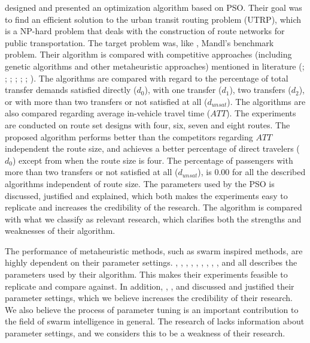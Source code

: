 \citet{kechagiopoulos14} designed and presented an optimization algorithm based on PSO. Their goal was to find an efficient solution to the urban transit routing problem (UTRP), which is a NP-hard problem that deals with the construction of route networks for public transportation. The target problem was, like \citet{nikolic14}, Mandl's benchmark problem. Their algorithm is compared with competitive approaches (including genetic algorithms and other metaheuristic approaches) mentioned in literature (\citet{baaj91}; \citet{chakroborty02}; \citet{kidwai98}; \citet{fan10}; \citet{fan09-2}; \citet{zhang10}; \citet{chew12}). The algorithms are compared with regard to the percentage of total transfer demands satisfied directly ($d_0$), with one transfer ($d_1$), two transfers ($d_2$), or with more than two transfers or not satisfied at all ($d_{unsat}$). The algorithms are also compared regarding average in-vehicle travel time ($ATT$). The experiments are conducted on route set designs with four, six, seven and eight routes. The proposed algorithm performs better than the competitors regarding $ATT$ independent the route size, and achieves a better percentage of direct travelers ($d_0$) except from when the route size is four. The percentage of passengers with more than two transfers or not satisfied at all ($d_{unsat}$), is $0.00$ for all the described algorithms independent of route size. The parameters used by the PSO is discussed, justified and explained, which both makes the experiments easy to replicate and increases the credibility of the research. The algorithm is compared with what we classify as relevant research, which clarifies both the strengths and weaknesses of their algorithm. \newline

The performance of metaheuristic methods, such as swarm inspired methods, are highly dependent on their parameter settings. \citet{hsiao04}, \citet{salehi-nezhad07}, \citet{tripathi09}, \citet{sedighpour14}, \citet{yang07}, \citet{salehinejad10}, \citet{jiang10}, \citet{poorzahedy11}, \citet{nikolic14}, and \citet{kechagiopoulos14} all describes the parameters used by their algorithm. This makes their experiments feasible to replicate and compare against. In addition, \citet{sedighpour14}, \citet{poorzahedy11}, and \citet{kechagiopoulos14} discussed and justified their parameter settings, which we believe increases the credibility of their research. We also believe the process of parameter tuning is an important contribution to the field of swarm intelligence in general. The research of \citet{dias14} lacks information about parameter settings, and we considers this to be a weakness of their research. 



